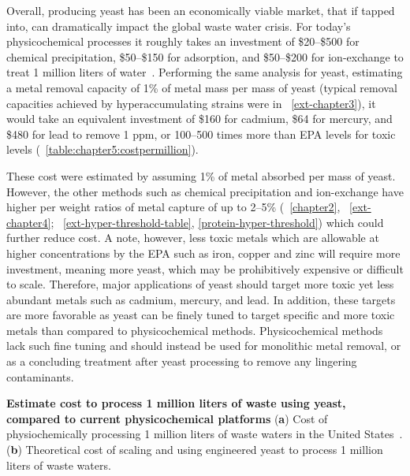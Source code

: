 \documentclass[../main/main]{subfiles}
\begin{document}
Overall, producing yeast has been an economically viable market, that if tapped into, can dramatically impact the global waste water crisis. For today's physicochemical processes it roughly takes an investment of \$20--\$500 for chemical precipitation, \$50--\$150 for adsorption, and \$50--\$200 for ion-exchange to treat 1 million liters of water~\cite{kumargupta2012}. Performing the same analysis for yeast, estimating a metal removal capacity of 1\% of metal mass per mass of yeast (typical removal capacities achieved by hyperaccumulating strains were in \CHAPTER~\ref{ext-chapter3}), it would take an equivalent investment of \$160 for cadmium, \$64 for mercury, and \$480 for lead to remove 1 ppm, or 100--500 times more than EPA levels for toxic levels (\TABLE~\ref{table:chapter5:costpermillion}).

These cost were estimated by assuming 1\% of metal absorbed per mass of yeast. However, the other methods such as chemical precipitation and ion-exchange have higher per weight ratios of metal capture of up to 2--5\% (\CHAPTER~\ref{chapter2}, ~\ref{ext-chapter4}; \APPENDIX~\ref{ext-hyper-threshold-table}, \ref{protein-hyper-threshold}) which could further reduce cost. A note, however, less toxic metals which are allowable at higher concentrations by the EPA such as iron, copper and zinc will require more investment, meaning more yeast, which may be prohibitively expensive or difficult to scale. Therefore, major applications of yeast should target more toxic yet less abundant metals such as cadmium, mercury, and lead. In addition, these targets are more favorable as yeast can be finely tuned to target specific and more toxic metals than compared to physicochemical methods. Physicochemical methods lack such fine tuning and should instead be used for monolithic metal removal, or as a concluding treatment after yeast processing to remove any lingering contaminants.

\begin{table}[H]
\small
\centering
	\begin{subtable}{\columnwidth}
		\small
		\centering
		\caption{}
		
	\end{subtable}
	\begin{subtable}{\columnwidth}
		\small
		\centering
		\caption{}
		
	\end{subtable}
	\caption[Estimate cost to process 1 million liters of waste using yeast, compared to current physicochemical platforms]
	{
		\textbf{Estimate cost to process 1 million liters of waste using yeast, compared to current physicochemical platforms}
		(\textbf{a}) Cost of physiochemically processing 1 million liters of waste waters in the United States~\cite{kumargupta2012}.
		(\textbf{b}) Theoretical cost of scaling and using engineered yeast to process 1 million liters of waste waters.
	}
	\label{table:chapter5:costpermillion}
\end{table}
\end{document}
